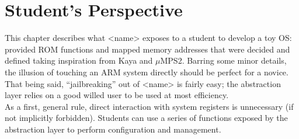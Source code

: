 \documentclass[12pt,a4paper,openright,twoside]{report}
\begin{document}
\clearpage{\pagestyle{empty}\cleardoublepage}
\chapter{Student's Perspective}
This chapter describes what <name> exposes to a student to develop a toy OS:
provided ROM functions and mapped memory addresses that were decided and defined
taking inspiration from Kaya and $\mu$MPS2.
Barring some minor details, the illusion of touching an ARM system directly should
be perfect for a novice. That being said, ``jailbreaking'' out of <name> is 
fairly easy; the abstraction layer relies on a good willed user to be used at 
most efficiency.\\
As a first, general rule, direct interaction with system registers is
unnecessary (if not implicitly forbidden). Students can use a series of functions
exposed by the abstraction layer to perform configuration and management.
\end{document}
